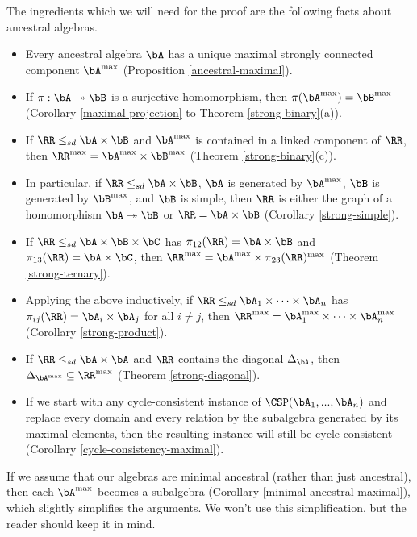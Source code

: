 The ingredients which we will need for the proof are the following facts about ancestral algebras.
\begin{itemize}
\item Every ancestral algebra $\bA$ has a unique maximal strongly connected component $\bA^{\max}$ (Proposition \ref{ancestral-maximal}).

\item If $\pi : \bA \twoheadrightarrow \bB$ is a surjective homomorphism, then $\pi(\bA^{\max}) = \bB^{\max}$ (Corollary \ref{maximal-projection} to Theorem \ref{strong-binary}(a)).

\item If $\RR \le_{sd} \bA \times \bB$ and $\bA^{\max}$ is contained in a linked component of $\RR$, then $\RR^{\max} = \bA^{\max}\times \bB^{\max}$ (Theorem \ref{strong-binary}(c)).

\item In particular, if $\RR \le_{sd} \bA \times \bB$, $\bA$ is generated by $\bA^{\max}$, $\bB$ is generated by $\bB^{\max}$, and $\bB$ is simple, then $\RR$ is either the graph of a homomorphism $\bA \twoheadrightarrow \bB$ or $\RR = \bA \times \bB$ (Corollary \ref{strong-simple}).

\item If $\RR \le_{sd} \bA \times \bB \times \bC$ has $\pi_{12}(\RR) = \bA \times \bB$ and $\pi_{13}(\RR) = \bA \times \bC$, then $\RR^{\max} = \bA^{\max} \times \pi_{23}(\RR)^{\max}$ (Theorem \ref{strong-ternary}).

\item Applying the above inductively, if $\RR \le_{sd} \bA_1 \times \cdots \times \bA_n$ has $\pi_{ij}(\RR) = \bA_i \times \bA_j$ for all $i \ne j$, then $\RR^{\max} = \bA_1^{\max} \times \cdots \times \bA_n^{\max}$ (Corollary \ref{strong-product}).

\item If $\RR \le_{sd} \bA\times \bA$ and $\RR$ contains the diagonal $\Delta_\bA$, then $\Delta_{\bA^{\max}} \subseteq \RR^{\max}$ (Theorem \ref{strong-diagonal}).

\item If we start with any cycle-consistent instance of $\CSP(\bA_1, ..., \bA_n)$ and replace every domain and every relation by the subalgebra generated by its maximal elements, then the resulting instance will still be cycle-consistent (Corollary \ref{cycle-consistency-maximal}).
\end{itemize}
If we assume that our algebras are minimal ancestral (rather than just ancestral), then each $\bA^{\max}$ becomes a subalgebra (Corollary \ref{minimal-ancestral-maximal}), which slightly simplifies the arguments. We won't use this simplification, but the reader should keep it in mind.

